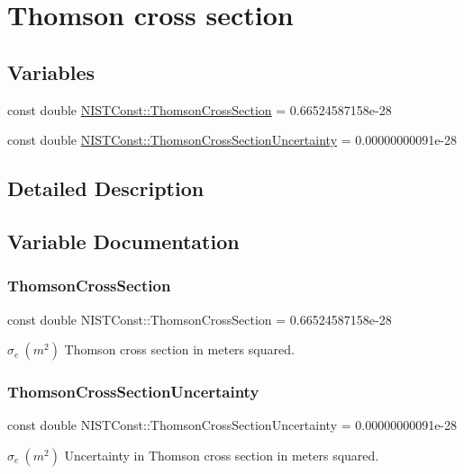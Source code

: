 \hypertarget{group___thomson}{}\section{Thomson cross section}
\label{group___thomson}
\subsection*{Variables}
\begin{DoxyCompactItemize}
\item 
const double \hyperlink{group___thomson_gac0806b1a7f3e82009afeac7ea16728ce}{N\+I\+S\+T\+Const\+::\+Thomson\+Cross\+Section} = 0.\+66524587158e-\/28
\item 
const double \hyperlink{group___thomson_ga550451740f39d6adccba7593d7ad497d}{N\+I\+S\+T\+Const\+::\+Thomson\+Cross\+Section\+Uncertainty} = 0.\+00000000091e-\/28
\end{DoxyCompactItemize}


\subsection{Detailed Description}


\subsection{Variable Documentation}
\mbox{\label{group___thomson_gac0806b1a7f3e82009afeac7ea16728ce}} 
\subsubsection{\texorpdfstring{Thomson\+Cross\+Section}{ThomsonCrossSection}}
{\footnotesize\ttfamily const double N\+I\+S\+T\+Const\+::\+Thomson\+Cross\+Section = 0.\+66524587158e-\/28}

$\sigma_e \ (m^2)$ Thomson cross section in meters squared. \mbox{\label{group___thomson_ga550451740f39d6adccba7593d7ad497d}} 
\subsubsection{\texorpdfstring{Thomson\+Cross\+Section\+Uncertainty}{ThomsonCrossSectionUncertainty}}
{\footnotesize\ttfamily const double N\+I\+S\+T\+Const\+::\+Thomson\+Cross\+Section\+Uncertainty = 0.\+00000000091e-\/28}

$\sigma_e \ (m^2)$ Uncertainty in Thomson cross section in meters squared. 